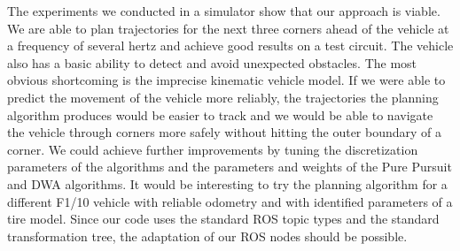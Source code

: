 The experiments we conducted in a simulator show that our approach is viable. We are able to plan trajectories for the next three corners ahead of the vehicle at a frequency of several hertz and achieve good results on a test circuit. The vehicle also has a basic ability to detect and avoid unexpected obstacles. The most obvious shortcoming is the imprecise kinematic vehicle model. If we were able to predict the movement of the vehicle more reliably, the trajectories the planning algorithm produces would be easier to track and we would be able to navigate the vehicle through corners more safely without hitting the outer boundary of a corner. We could achieve further improvements by tuning the discretization parameters of the algorithms and the parameters and weights of the Pure Pursuit and DWA algorithms. It would be interesting to try the planning algorithm for a different F1/10 vehicle with reliable odometry and with identified parameters of a tire model. Since our code uses the standard \gls*{ROS} topic types and the standard transformation tree, the adaptation of our \gls*{ROS} nodes should be possible.